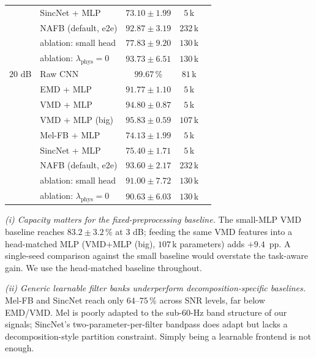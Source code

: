 \documentclass[journal]{IEEEtran}
\theoremstyle{remark}
\begin{document}
\begin{table}[t]
\begin{tabular}{rlccr}
       & SincNet + MLP                     & $73.10 \pm 1.99$                    & $5$\,k   \\
       & NAFB (default, e2e)               & $92.87 \pm 3.19$                    & $232$\,k \\
       & \quad ablation: small head        & $77.83 \pm 9.20$                    & $130$\,k \\
       & \quad ablation: $\lambda_{\text{phys}}{=}0$ & $93.73 \pm 6.51$           & $130$\,k \\
\midrule
$20$ dB & Raw CNN                          & $99.67$\,\%                         & $81$\,k  \\
       & EMD + MLP                         & $91.77 \pm 1.10$                    & $5$\,k   \\
       & VMD + MLP                         & $94.80 \pm 0.87$                    & $5$\,k   \\
       & VMD + MLP (big)                   & $\mathbf{95.83 \pm 0.59}$           & $107$\,k \\
       & Mel-FB + MLP                      & $74.13 \pm 1.99$                    & $5$\,k   \\
       & SincNet + MLP                     & $75.40 \pm 1.71$                    & $5$\,k   \\
       & NAFB (default, e2e)               & $93.60 \pm 2.17$                    & $232$\,k \\
       & \quad ablation: small head        & $91.00 \pm 7.72$                    & $130$\,k \\
       & \quad ablation: $\lambda_{\text{phys}}{=}0$ & $90.63 \pm 6.03$           & $130$\,k \\
\bottomrule
\end{tabular}
\end{table}

\emph{(i) Capacity matters for the fixed-preprocessing baseline.}
The small-MLP VMD baseline reaches $83.2 \pm 3.2$\,\% at $3$ dB;
feeding the same VMD features into a head-matched MLP
(VMD+MLP (big), $107$\,k parameters) adds $+9.4$~pp. A single-seed
comparison against the small baseline would overstate the task-aware
gain. We use the head-matched baseline throughout.

\emph{(ii) Generic learnable filter banks underperform
decomposition-specific baselines.} Mel-FB and SincNet reach only
$64$--$75$\,\% across SNR levels, far below EMD/VMD. Mel is poorly
adapted to the sub-$60$-Hz band structure of our signals; SincNet's
two-parameter-per-filter bandpass does adapt but lacks a
decomposition-style partition constraint. Simply being a learnable
frontend is not enough.
\end{document}
